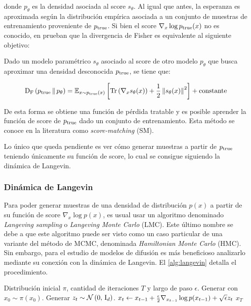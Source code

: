 donde $p_\theta$ es la densidad asociada al score $s_\theta$. Al igual que antes, la esperanza es aproximada según la distribución empírica asociada a un conjunto de muestras de entrenamiento proveniente de $p_{\operatorname{true}}$. Si bien el score $\nabla_x\log p_{\operatorname{true}}(x)$ no es conocido, en \cite{hyvarinen2005estimation} prueban que la divergencia de Fisher es equivalente al siguiente objetivo:

\begin{prop}
    Dado un modelo paramétrico $s_\theta$ asociado al score de otro modelo $p_\theta$ que busca aproximar una densidad desconocida $p_{\operatorname{true}}$, se tiene que:

    \begin{equation}
        \operatorname{D_F}\left(p_{\operatorname{true}}\,\|\,p_\theta\right) =
        \mathbb{E}_{x\sim p_{\operatorname{true}}(x)}\left[\operatorname{Tr}\left(\nabla_x s_\theta(x)\right) + \frac{1}{2}\left\lVert s_\theta(x) \right\rVert^2\right] + \operatorname{constante}
    \end{equation}
\end{prop}

De esta forma se obtiene una función de pérdida tratable y es posible aprender la función de score de $p_{\operatorname{true}}$ dado un conjunto de entrenamiento. Esta método se conoce en la literatura como \textit{score-matching} (SM).

Lo único que queda pendiente es ver cómo generar muestras a partir de $p_{\operatorname{true}}$ teniendo únicamente su función de score, lo cual se consigue siguiendo la dinámica de Langevin.

\subsubsection{Dinámica de Langevin}

Para poder generar muestras de una densidad de distribución $p(x)$ a partir de su función de score $\nabla_x\log p(x)$, es usual usar un algoritmo denominado \textit{Langeving sampling} o \textit{Langeving Monte Carlo} (LMC). Este último nombre se debe a que este algoritmo puede ser visto como un caso particular de una variante del método de MCMC, denominada \textit{Hamiltonian Monte Carlo} (HMC). Sin embargo, para el estudio de modelos de difusión es más beneficioso analizarlo mediante su conexión con la dinámica de Langevin. El \autoref{alg:langevin} detalla el procedimiento.

\begin{algorithm}
    \caption{Langevin sampling}
    \label{alg:langevin}
    \begin{algorithmic}[1]
        \Require Distribución inicial $\pi$, cantidad de iteraciones $T$ y largo de paso $\epsilon$.
        \State Generar con $x_0\sim \pi(x_0)$.
        \State Generar $z_t\sim \mathcal{N}\left(0,\,\operatorname{I}_{d}\right)$.
        \State $x_t\gets x_{t-1} + \frac{\epsilon}{2}\nabla_{x_{t-1}} \log p(x_{t-1}) + \sqrt{\epsilon} z_t$
        \EndFor
        \State\Return $x_T$
    \end{algorithmic}
\end{algorithm}

